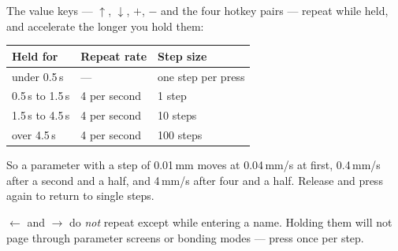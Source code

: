 The value keys --- $\uparrow$, $\downarrow$, $+$, $-$ and the four hotkey pairs
--- repeat while held, and accelerate the longer you hold them:

\begin{center}\small
\begin{tabular}{@{}L{40mm}L{40mm}L{40mm}@{}}
\toprule
\textbf{Held for} & \textbf{Repeat rate} & \textbf{Step size} \\
\midrule
under 0.5\,s      & ---                  & one step per press \\
0.5\,s to 1.5\,s  & 4 per second         & 1 step \\
1.5\,s to 4.5\,s  & 4 per second         & 10 steps \\
over 4.5\,s       & 4 per second         & 100 steps \\
\bottomrule
\end{tabular}
\end{center}

So a parameter with a step of 0.01\,mm moves at 0.04\,mm/s at first, 0.4\,mm/s
after a second and a half, and 4\,mm/s after four and a half. Release and press
again to return to single steps.

\begin{wbnote}
$\leftarrow$ and $\rightarrow$ do \emph{not} repeat except while entering a
name. Holding them will not page through parameter screens or bonding modes ---
press once per step.
\end{wbnote}

